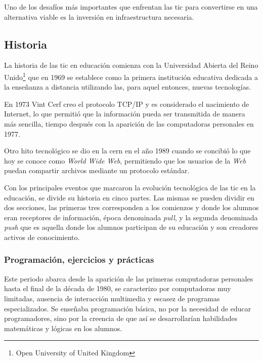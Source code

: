 Uno de los desafíos más importantes que enfrentan las \Gls{tic} para convertirse
en una alternativa viable es la inversión en infraestructura
necesaria\cite{unesco:ict}. 

\subsection{Historia}

La historia de las \Gls{tic} en educación comienza con la Universidad Abierta
del Reino Unido\footnote{Open University of United Kingdom} que en 1969 se
establece como la primera institución educativa dedicada a la enseñanza a
distancia utilizando las, para aquel entonces, nuevas
tecnologías\cite{tinio:ict}.

En 1973 Vint Cerf creo el protocolo TCP/IP y es considerado el nacimiento de
Internet\cite{white:ict}, lo que permitió que la información pueda ser
transmitida de manera más sencilla, tiempo después con la aparición de las
computadoras personales en 1977\cite{white:ict}. 

Otro hito tecnológico se dio en la \Gls{cern} en el año 1989 cuando se concibió
lo que hoy se conoce como \emph{World Wide Web}, permitiendo que los usuarios de
la \emph{Web} puedan compartir archivos mediante un protocolo
estándar\cite{white:ict}. 

Con los principales eventos que marcaron la evolución tecnológica de las
\Gls{tic} en la educación, se divide su historia en cinco partes. Las mismas se
pueden dividir en dos secciones, las primeras tres corresponden a los comienzos
y donde los alumnos eran receptores de información, época denominada
\emph{pull}, y la segunda denominada \emph{push}\cite{white:ict} que es aquella
donde los alumnos participan de su educación y son creadores activos de
conocimiento.

\subsubsection{Programación, ejercicios y prácticas}

Este periodo abarca desde la aparición de las primeras computadoras
personales hasta el final de la década de 1980, se caracterizo por
computadoras muy limitadas, ausencia de interacción multimedia y escasez de
programas especializados. Se enseñaba programación básica\cite{leinonen:ict}, no
por la necesidad de educar programadores, sino por la creencia de que así se
desarrollarían habilidades matemáticas y lógicas en los alumnos. 


